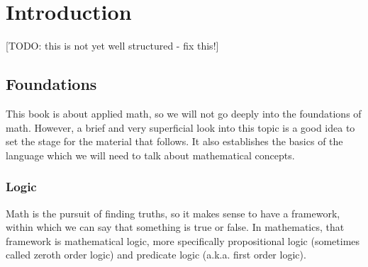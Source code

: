 \chapter{Introduction} 
[TODO: this is not yet well structured - fix this!]

\section{Foundations} 

This book is about applied math, so we will not go deeply into the foundations of math. However, a brief and very superficial look into this topic is a good idea to set the stage for the material that follows. It also establishes the basics of the language which we will need to talk about mathematical concepts.

\subsection{Logic}
Math is the pursuit of finding truths, so it makes sense to have a framework, within which we can say that something is true or false. In mathematics, that framework is mathematical logic, more specifically propositional logic (sometimes called zeroth order logic) and predicate logic (a.k.a. first order logic). 


